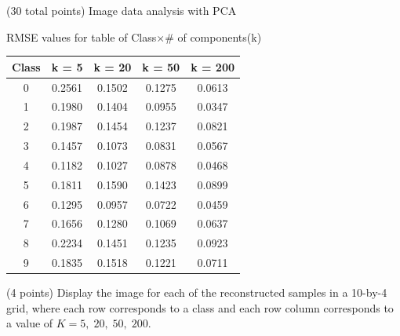 \documentclass[12pt]{article}
\begin{document}
\begin{question}{(30 total points) Image data analysis with PCA}
\begin{subquestion}
     

      \begin{answerbox}{25em}
         \begin{center}
        \caption{RMSE values for table of Class$\times$\# of components(k)}\newline
        \begin{tabular}{c|c|c|c|c}
        \hline
        Class & k = 5 & k = 20 & k = 50 & k = 200 \\ \hline
        0 & 0.2561 & 0.1502 & 0.1275 & 0.0613 \\
        1 & 0.1980 & 0.1404 & 0.0955 & 0.0347 \\
        2 & 0.1987 & 0.1454 & 0.1237 & 0.0821 \\
        3 & 0.1457 & 0.1073 & 0.0831 & 0.0567 \\
        4 & 0.1182 & 0.1027 & 0.0878 & 0.0468 \\
        5 & 0.1811 & 0.1590 & 0.1423 & 0.0899 \\
        6 & 0.1295 & 0.0957 & 0.0722 & 0.0459 \\
        7 & 0.1656 & 0.1280 & 0.1069 & 0.0637 \\
        8 & 0.2234 & 0.1451 & 0.1235 & 0.0923 \\
        9 & 0.1835 & 0.1518 & 0.1221 & 0.0711 \\
        \hline
        \end{tabular}
        \end{center}
      \end{answerbox}
  


   \end{subquestion}
   
   \begin{subquestion}{(4 points)
       Display the image for each of the reconstructed samples in
       a 10-by-4 grid, where each row corresponds to a class and
       each row column corresponds to a value of $K=5, \; 20, \; 50, \; 200$.
     } \label{Q1.7}


   


\end{subquestion}
\end{question}
\end{document}

